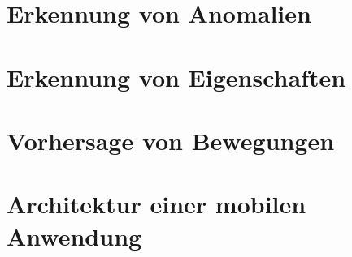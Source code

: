 \section{Erkennung von Anomalien}
\section{Erkennung von Eigenschaften}
\section{Vorhersage von Bewegungen}
\section{Architektur einer mobilen Anwendung}